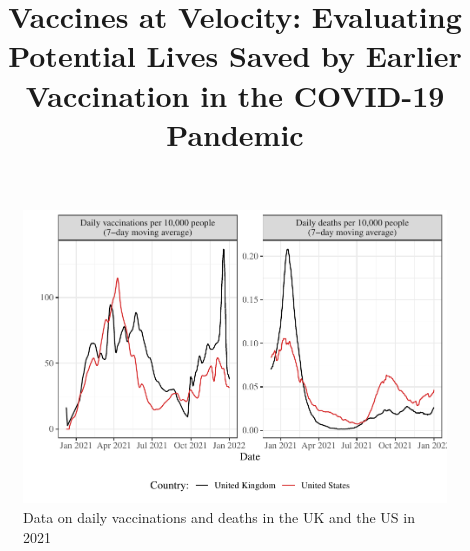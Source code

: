 \documentclass{article}
\title{Vaccines at Velocity: Evaluating Potential Lives Saved by Earlier Vaccination in the COVID-19 Pandemic}
\author{
  }
\begin{document}
\maketitle

\begin{figure}[H]

{\centering \includegraphics[height=0.4\textheight,]{_main_files/figure-latex/baseline-vacc-death-1}

}

\caption{Data on daily vaccinations and deaths in the UK and the US in 2021}\label{fig:baseline-vacc-death}
\end{figure}
\end{document}
